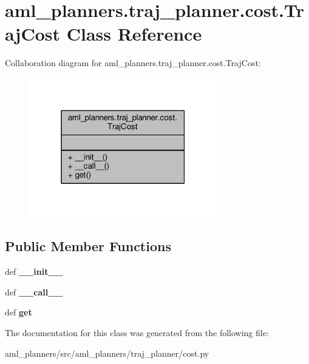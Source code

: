 \hypertarget{classaml__planners_1_1traj__planner_1_1cost_1_1_traj_cost}{\section{aml\-\_\-planners.\-traj\-\_\-planner.\-cost.\-Traj\-Cost Class Reference}
\label{classaml__planners_1_1traj__planner_1_1cost_1_1_traj_cost}
}


Collaboration diagram for aml\-\_\-planners.\-traj\-\_\-planner.\-cost.\-Traj\-Cost\-:
\nopagebreak
\begin{figure}[H]
\begin{center}
\leavevmode
\includegraphics[width=232pt]{classaml__planners_1_1traj__planner_1_1cost_1_1_traj_cost__coll__graph}
\end{center}
\end{figure}
\subsection*{Public Member Functions}
\begin{DoxyCompactItemize}
\item 
\hypertarget{classaml__planners_1_1traj__planner_1_1cost_1_1_traj_cost_ae429e38d01136b2033c19e2f25de4c95}{def {\bfseries \-\_\-\-\_\-init\-\_\-\-\_\-}}\label{classaml__planners_1_1traj__planner_1_1cost_1_1_traj_cost_ae429e38d01136b2033c19e2f25de4c95}

\item 
\hypertarget{classaml__planners_1_1traj__planner_1_1cost_1_1_traj_cost_a8faf444cd4e34aa186cad921cf50eeec}{def {\bfseries \-\_\-\-\_\-call\-\_\-\-\_\-}}\label{classaml__planners_1_1traj__planner_1_1cost_1_1_traj_cost_a8faf444cd4e34aa186cad921cf50eeec}

\item 
\hypertarget{classaml__planners_1_1traj__planner_1_1cost_1_1_traj_cost_ab68f7dabc15db0808735255bd5fe276f}{def {\bfseries get}}\label{classaml__planners_1_1traj__planner_1_1cost_1_1_traj_cost_ab68f7dabc15db0808735255bd5fe276f}

\end{DoxyCompactItemize}


The documentation for this class was generated from the following file\-:\begin{DoxyCompactItemize}
\item 
aml\-\_\-planners/src/aml\-\_\-planners/traj\-\_\-planner/cost.\-py\end{DoxyCompactItemize}
